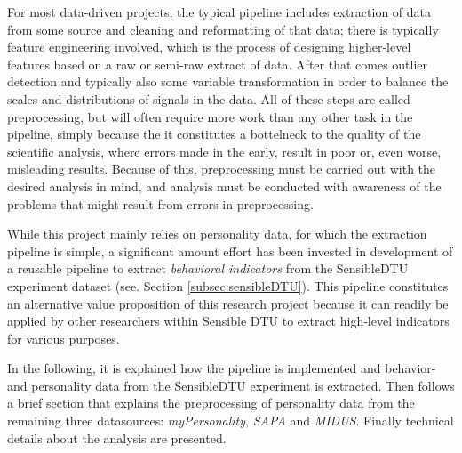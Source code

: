 For most data-driven projects, the typical pipeline includes extraction of data from some source and cleaning and reformatting of that data; there is typically feature engineering involved, which is the process of designing higher-level features based on a raw or semi-raw extract of data. After that comes outlier detection and typically also some variable transformation in order to balance the scales and distributions of signals in the data. All of these steps are called preprocessing, but will often require more work than any other task in the pipeline, simply because the it constitutes a bottelneck to the quality of the scientific analysis, where errors made in the early, result in poor or, even worse, misleading results. Because of this, preprocessing must be carried out with the desired analysis in mind, and analysis must be conducted with awareness of the problems that might result from errors in preprocessing.

While this project mainly relies on personality data, for which the extraction pipeline is simple, a significant amount effort has been invested in development of a reusable pipeline to extract \textit{behavioral indicators} from the SensibleDTU experiment dataset (see. Section \ref{subsec:sensibleDTU}). This pipeline constitutes an alternative value proposition of this research project because it can readily be applied by other researchers within Sensible DTU to extract high-level indicators for various purposes.

In the following, it is explained how the pipeline is implemented and behavior- and personality data from the SensibleDTU experiment is extracted. Then follows a brief section that explains the preprocessing of personality data from the remaining three datasources: \textit{myPersonality}, \textit{SAPA} and \textit{MIDUS}. Finally technical details about the analysis are presented.